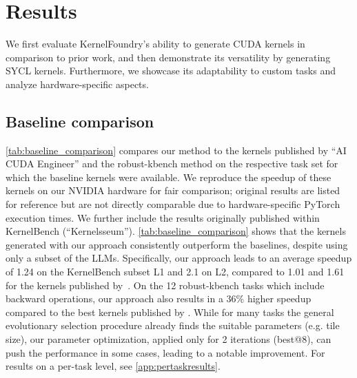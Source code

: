 \section{Results} \label{sec:results}

We first evaluate KernelFoundry's ability to generate CUDA kernels in comparison to prior work, and then demonstrate its versatility by generating SYCL kernels. Furthermore, we showcase its adaptability to custom tasks and analyze hardware-specific aspects.

\subsection{Baseline comparison}

\autoref{tab:baseline_comparison} compares our method to the kernels published by ``AI CUDA Engineer'' and the robust-kbench method on the respective task set for which the baseline kernels were available. We reproduce the speedup of these kernels on our NVIDIA hardware for fair comparison; original results are listed for reference but are not directly comparable due to hardware-specific PyTorch execution times. We further include the results originally published within KernelBench (``Kernelsseum''). \autoref{tab:baseline_comparison} shows that the kernels generated with our approach consistently outperform the baselines, despite using only a subset of the LLMs. Specifically, our approach leads to an average speedup of 1.24 on the KernelBench subset L1 and 2.1 on L2, compared to 1.01 and 1.61 for the kernels published by~\citet{lange2025ai}. On the 12 robust-kbench tasks which include backward operations, our approach also results in a 36\% higher speedup compared to the best kernels published by \citet{lange2025towards}. 
While for many tasks the general evolutionary selection procedure already finds the suitable parameters (e.g. tile size), our parameter optimization, applied only for 2 iterations (best@8), can push the performance in some cases, leading to a notable improvement. For results on a per-task level, see \autoref{app:pertaskresults}.

\begin{table}[ht]
    \centering
    \resizebox{\linewidth}{!}{%
    
}
\caption{Comparison to baselines on CUDA kernel optimization. Best results per task set in bold. *\emph{Kernelsseum} evaluated on Nvidia L40S. \textsuperscript{\textdagger}\emph{AI CUDA Engineer original} and \emph{Robust-kbench original} both evaluated on Nvidia H100. All others evaluated on Nvidia A6000.}
\label{tab:baseline_comparison}
\end{table}


